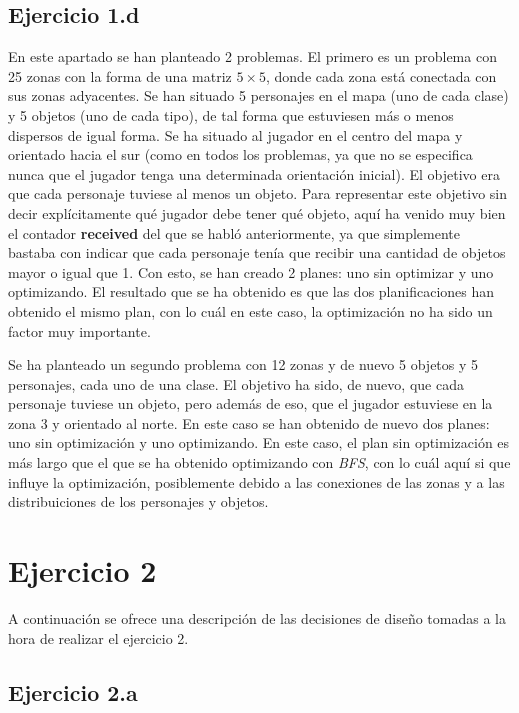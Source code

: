 \documentclass[11pt,a4paper]{article}
\begin{document}
\subsection{Ejercicio 1.d}

En este apartado se han planteado 2 problemas. El primero es un problema con 25 zonas con la forma de una matriz $5 \times 5$, donde
cada zona está conectada con sus zonas adyacentes. Se han situado 5 personajes en el mapa (uno de cada clase) y 5 objetos (uno de cada
tipo), de tal forma que estuviesen más o menos dispersos de igual forma. Se ha situado al jugador en el centro del mapa y orientado
hacia el sur (como en todos los problemas, ya que no se especifica nunca que el jugador tenga una determinada orientación inicial).
El objetivo era que cada personaje tuviese al menos un objeto. Para representar este objetivo sin decir explícitamente qué jugador
debe tener qué objeto, aquí ha venido muy bien el contador \textbf{received} del que se habló anteriormente, ya que simplemente
bastaba con indicar que cada personaje tenía que recibir una cantidad de objetos mayor o igual que 1. Con esto, se han creado 2
planes: uno sin optimizar y uno optimizando. El resultado que se ha obtenido es que las dos planificaciones han obtenido el mismo
plan, con lo cuál en este caso, la optimización no ha sido un factor muy importante.

Se ha planteado un segundo problema con 12 zonas y de nuevo 5 objetos y 5 personajes, cada uno de una clase. El objetivo ha sido, de
nuevo, que cada personaje tuviese un objeto, pero además de eso, que el jugador estuviese en la zona 3 y orientado al norte. En este
caso se han obtenido de nuevo dos planes: uno sin optimización y uno optimizando. En este caso, el plan sin optimización es más largo
que el que se ha obtenido optimizando con \textit{BFS}, con lo cuál aquí si que influye la optimización, posiblemente debido a las
conexiones de las zonas y a las distribuiciones de los personajes y objetos.

\section{Ejercicio 2}

A continuación se ofrece una descripción de las decisiones de diseño tomadas a la hora de realizar el ejercicio 2.

\subsection{Ejercicio 2.a}
\end{document}
